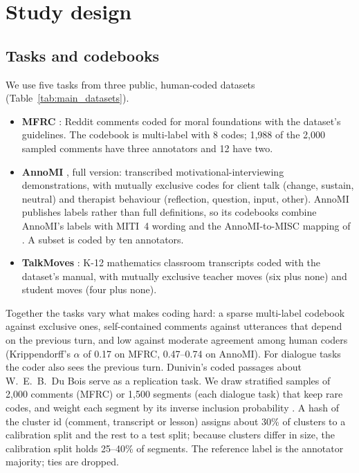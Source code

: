 \section{Study design}
\label{sec:setup}

\subsection{Tasks and codebooks}
We use five tasks from three public, human-coded datasets (Table~\ref{tab:main_datasets}).
\begin{itemize}
  \item \textbf{MFRC} \citep{trager2022mfrc}: Reddit comments coded for moral foundations with the dataset's guidelines. The
  codebook is multi-label with 8 codes; 1,988 of the 2,000 sampled comments have three annotators and 12 have two.
  \item \textbf{AnnoMI} \citep{wu2022annomi,wu2023annomi}, full version: transcribed motivational-interviewing demonstrations, with mutually exclusive
  codes for client talk (change, sustain, neutral) and therapist behaviour (reflection, question, input, other). AnnoMI
  publishes labels rather than full definitions, so its codebooks combine AnnoMI's labels with MITI~4 wording
  \citep{moyers2016miti} and the AnnoMI-to-MISC mapping of \citet{sun2024bimisc}. A subset is coded by ten annotators.
  \item \textbf{TalkMoves} \citep{suresh2022talkmoves}: K-12 mathematics classroom transcripts coded with the dataset's
  manual, with mutually exclusive teacher moves (six plus none) and student moves (four plus none).
\end{itemize}
Together the tasks vary what makes coding hard: a sparse multi-label codebook against exclusive ones, self-contained
comments against utterances that depend on the previous turn, and low against moderate agreement among human coders
(Krippendorff's $\alpha$ of 0.17 on MFRC, 0.47--0.74 on AnnoMI). For dialogue tasks the coder also sees the previous turn.
Dunivin's coded passages about W.~E.~B.~Du Bois
\citep{dunivin2025scaling} serve as a replication task. We draw stratified samples of 2,000 comments (MFRC) or 1,500
segments (each dialogue task) that keep rare codes, and weight each segment by its inverse inclusion probability
\citep{horvitz1952generalization}. A hash of the cluster id (comment, transcript or lesson) assigns about 30\% of clusters to a
calibration split and the rest to a test split; because clusters differ in size, the calibration split holds 25--40\% of
segments. The reference label is the annotator majority; ties are dropped.

